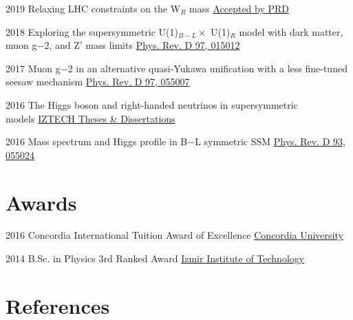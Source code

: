 \documentclass[]{friggeri-cv}
\begin{document}
\begin{entrylist}
	
	\entry
	{2019}
	{Relaxing LHC constraints on the W$_R$ mass}
	{\href{https://journals.aps.org/prd/accepted/c2077Q37M8519c28e2f21b469c0214b413725c614}{Accepted by PRD}} 
	
	\entry
	{2018}
	{Exploring the supersymmetric U(1)$_{B-L} \times$ U(1)$_R$ model with dark matter, muon g−2, and Z' mass limits}
	{\href{https://journals.aps.org/prd/abstract/10.1103/PhysRevD.97.015012}{Phys. Rev. D 97, 015012}} 
	
	\entry
	{2017}
	{Muon g−2 in an alternative quasi-Yukawa unification with a less fine-tuned seesaw mechanism}
	{\href{http://journals.aps.org/prd/abstract/10.1103/PhysRevD.97.055007}{Phys. Rev. D 97, 055007}} 
	
	\entry
	{2016}
	{The Higgs boson and right-handed neutrinos in supersymmetric \\ models}
	{\href{http://openaccess.iyte.edu.tr/xmlui/handle/11147/2842}{IZTECH Theses \& Dissertations}} 
	
	\entry
	{2016}
	{Mass spectrum and Higgs profile in B−L symmetric SSM}
	{\href{http://journals.aps.org/prd/abstract/10.1103/PhysRevD.93.055024}{Phys. Rev. D 93, 055024}} 
	
\end{entrylist}

\section{Awards}

\begin{entrylist}


\entry
{2016}
{Concordia International Tuition Award of Excellence}
{\href{http://www.concordia.ca}{Concordia University}} 	


\entry
{2014}
{B.Sc. in Physics 3rd Ranked Award}
{\href{http://www.iyte.edu.tr/AnaSayfa.aspx?d=ENG}{Izmir Institute of Technology}} 	
	
	
\end{entrylist}	
	


\section{References}
	
\end{document}
